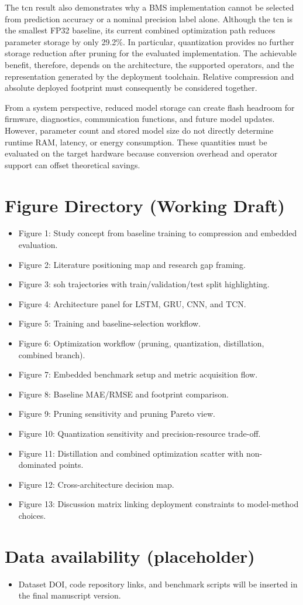 \documentclass[final,3p,times]{elsarticle}
\begin{document}
The \ac{tcn} result also demonstrates why a BMS implementation cannot be selected from prediction accuracy or a nominal precision label alone. Although the \ac{tcn} is the smallest FP32 baseline, its current combined optimization path reduces parameter storage by only 29.2\%. In particular, quantization provides no further storage reduction after pruning for the evaluated implementation. The achievable benefit, therefore, depends on the architecture, the supported operators, and the representation generated by the deployment toolchain. Relative compression and absolute deployed footprint must consequently be considered together.

From a system perspective, reduced model storage can create flash headroom for firmware, diagnostics, communication functions, and future model updates. However, parameter count and stored model size do not directly determine runtime RAM, latency, or energy consumption. These quantities must be evaluated on the target hardware because conversion overhead and operator support can offset theoretical savings. 

\section*{Figure Directory (Working Draft)}
\begin{itemize}[leftmargin=*]
\item Figure 1: Study concept from baseline training to compression and embedded evaluation.
\item Figure 2: Literature positioning map and research gap framing.
\item Figure 3: \ac{soh} trajectories with train/validation/test split highlighting.
\item Figure 4: Architecture panel for LSTM, GRU, CNN, and TCN.
\item Figure 5: Training and baseline-selection workflow.
\item Figure 6: Optimization workflow (pruning, quantization, distillation, combined branch).
\item Figure 7: Embedded benchmark setup and metric acquisition flow.
\item Figure 8: Baseline MAE/RMSE and footprint comparison.
\item Figure 9: Pruning sensitivity and pruning Pareto view.
\item Figure 10: Quantization sensitivity and precision-resource trade-off.
\item Figure 11: Distillation and combined optimization scatter with non-dominated points.
\item Figure 12: Cross-architecture decision map.
\item Figure 13: Discussion matrix linking deployment constraints to model-method choices.
\end{itemize}

\section*{Data availability (placeholder)}
\begin{itemize}[leftmargin=*]
\item Dataset DOI, code repository links, and benchmark scripts will be inserted in the final manuscript version.
\end{itemize}



%
\end{document}
